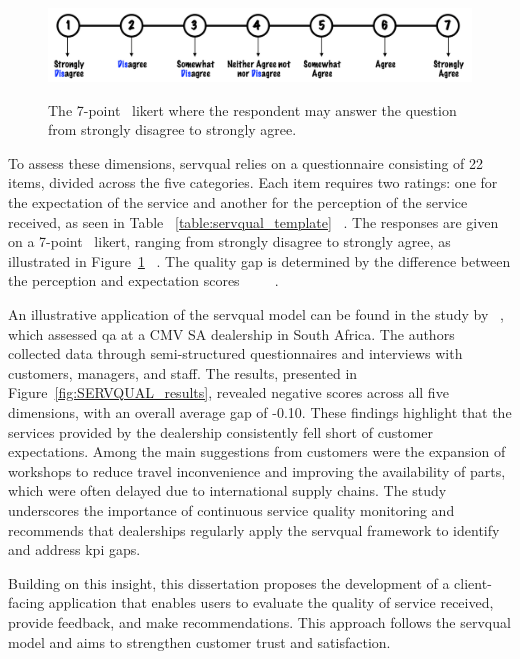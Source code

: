 \begin{figure}[h]
  \caption{The 7-point ~\ac{likert} where the respondent may answer the question from strongly disagree to strongly agree. ~\cite{master_servqual_model}}
  \centering
  \includegraphics[width=\textwidth]{figs/likert_scale}
  \label{fig:likert_scale}
\end{figure}


To assess these dimensions, \ac{servqual} relies on a questionnaire consisting of 22 items, divided across the five categories. Each item requires two ratings: one for the expectation of the service and another for the perception of the service received, as seen in Table ~\ref{table:servqual_template} ~\cite{SERVQUAL_OLD}. The responses are given on a 7-point ~\ac{likert}, ranging from strongly disagree to strongly agree, as illustrated in Figure~\ref{fig:likert_scale} ~\cite{Measuring_After_sales_Service_Quality}. The quality gap is determined by the difference between the perception and expectation scores ~\cite{servqual_blog_da_qualidade} ~\cite{Measuring_After_sales_Service_Quality} ~\cite{SERVQUAL_OLD}.

An illustrative application of the \ac{servqual} model can be found in the study by ~\citet{Measuring_After_sales_Service_Quality}, which assessed \ac{qa} at a CMV SA dealership in South Africa. The authors collected data through semi-structured questionnaires and interviews with customers, managers, and staff. The results, presented in Figure~\ref{fig:SERVQUAL_results}, revealed negative scores across all five dimensions, with an overall average gap of -0.10. These findings highlight that the services provided by the dealership consistently fell short of customer expectations. Among the main suggestions from customers were the expansion of workshops to reduce travel inconvenience and improving the availability of parts, which were often delayed due to international supply chains. The study underscores the importance of continuous service quality monitoring and recommends that dealerships regularly apply the \ac{servqual} framework to identify and address \acs{kpi} gaps.

Building on this insight, this dissertation proposes the development of a client-facing application that enables users to evaluate the quality of service received, provide feedback, and make recommendations. This approach follows the \ac{servqual} model and aims to strengthen customer trust and satisfaction.


